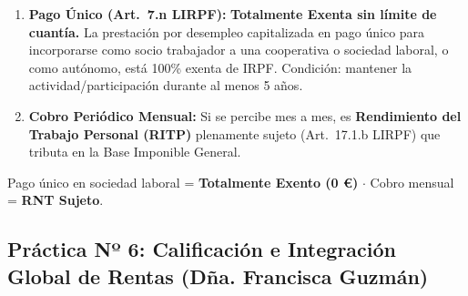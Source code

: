 \documentclass[11pt,a4paper,openany]{article}
\begin{document}
\begin{solucionBox}
\begin{enumerate}
    \item \textbf{Pago Único (Art.~7.n LIRPF):} \textbf{Totalmente Exenta sin límite de cuantía.}
    La prestación por desempleo capitalizada en pago único para incorporarse como socio trabajador a una cooperativa o sociedad laboral, o como autónomo, está 100\% exenta de IRPF. Condición: mantener la actividad/participación durante al menos 5 años.
    
    \item \textbf{Cobro Periódico Mensual:}
    Si se percibe mes a mes, es \textbf{Rendimiento del Trabajo Personal (RITP)} plenamente sujeto (Art.~17.1.b LIRPF) que tributa en la Base Imponible General.
\end{enumerate}
\end{solucionBox}

\begin{resultadoBox}[Resultados]
Pago único en sociedad laboral = \textbf{Totalmente Exento (0 \euro)} $\cdot$ Cobro mensual = \textbf{RNT Sujeto}.
\end{resultadoBox}

\newpage

\subsection{Práctica Nº 6: Calificación e Integración Global de Rentas (Dña. Francisca Guzmán)}
\end{document}
